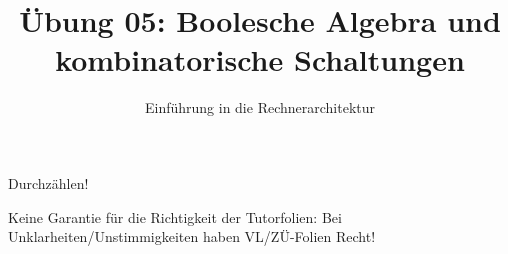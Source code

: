 

\title{Übung 05: Boolesche Algebra und \\kombinatorische Schaltungen}
\subtitle{Einführung in die Rechnerarchitektur}
\date{}



\maketitle

\begin{frame}[c]{}{}
	\begin{center}
		\LARGE  Durchzählen!
	\end{center}
\end{frame}

\begin{frame}[c]{}{}
	\begin{center}
		\LARGE  Keine Garantie für die Richtigkeit der Tutorfolien: Bei Unklarheiten/Unstimmigkeiten
		haben VL/ZÜ-Folien Recht!
	\end{center}
\end{frame}

